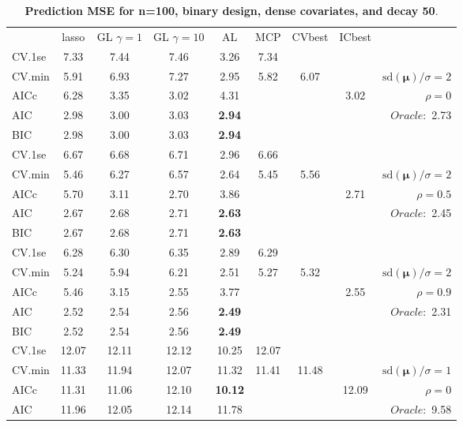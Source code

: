 \clearpage
\begin{table}\vspace{-.5cm}
\caption[l]{ { \bf Prediction MSE for n=100, binary design, 
dense covariates, and  decay  50}.}
\vspace{-.5cm}
\footnotesize{}
\begin{center}
\begin{tabular}{l*{7}{c}|r}
 & lasso & GL $\gamma=1$ & GL $\gamma=10$ & AL & MCP  & CVbest & ICbest  \\
\cline{1-9}
CV.1se & 7.33 & 7.44 & 7.46 & 3.26 & 7.34 & & & \\
CV.min & 5.91 & 6.93 & 7.27 & 2.95 & 5.82 & 6.07 & & $\mathrm{sd}(\mathbf{\mu})/\sigma=2$ \\
AICc & 6.28 & 3.35 & 3.02 & 4.31 & & & 3.02 &  $\rho=0$ \\
AIC & 2.98 & 3.00 & 3.03 & {\bf 2.94} & & & &  \multirow{2}{*}{$Oracle: $ 2.73} \\
BIC & 2.98 & 3.00 & 3.03 & {\bf 2.94} & & & &  \\
 \hline 
CV.1se & 6.67 & 6.68 & 6.71 & 2.96 & 6.66 & & & \\
CV.min & 5.46 & 6.27 & 6.57 & 2.64 & 5.45 & 5.56 & & $\mathrm{sd}(\mathbf{\mu})/\sigma=2$ \\
AICc & 5.70 & 3.11 & 2.70 & 3.86 & & & 2.71 &  $\rho=0.5$ \\
AIC & 2.67 & 2.68 & 2.71 & {\bf 2.63} & & & &  \multirow{2}{*}{$Oracle: $ 2.45} \\
BIC & 2.67 & 2.68 & 2.71 & {\bf 2.63} & & & &  \\
 \hline 
CV.1se & 6.28 & 6.30 & 6.35 & 2.89 & 6.29 & & & \\
CV.min & 5.24 & 5.94 & 6.21 & 2.51 & 5.27 & 5.32 & & $\mathrm{sd}(\mathbf{\mu})/\sigma=2$ \\
AICc & 5.46 & 3.15 & 2.55 & 3.77 & & & 2.55 &  $\rho=0.9$ \\
AIC & 2.52 & 2.54 & 2.56 & {\bf 2.49} & & & &  \multirow{2}{*}{$Oracle: $ 2.31} \\
BIC & 2.52 & 2.54 & 2.56 & {\bf 2.49} & & & &  \\
 \hline 
CV.1se & 12.07 & 12.11 & 12.12 & 10.25 & 12.07 & & & \\
CV.min & 11.33 & 11.94 & 12.07 & 11.32 & 11.41 & 11.48 & & $\mathrm{sd}(\mathbf{\mu})/\sigma=1$ \\
AICc & 11.31 & 11.06 & 12.10 & {\bf 10.12} & & & 12.09 &  $\rho=0$ \\
AIC & 11.96 & 12.05 & 12.14 & 11.78 & & & &  \multirow{2}{*}{$Oracle: $ 9.58} \\

\end{tabular}
\end{center}
\end{table}
